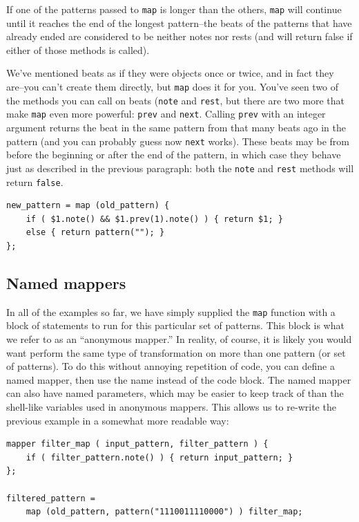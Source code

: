 If one of the patterns passed to {\tt map} is longer than the others, {\tt map} will continue until it reaches the end of the longest pattern--the beats of the patterns that have already ended are considered to be neither notes nor rests (and will return false if either of those methods is called).

We've mentioned beats as if they were objects once or twice, and in fact they are--you can't create them directly, but {\tt map} does it for you.  You've seen two of the methods you can call on beats ({\tt note} and {\tt rest}, but there are two more that make {\tt map} even more powerful:  {\tt prev} and {\tt next}.
Calling {\tt prev} with an integer argument returns the beat in the same pattern from that many beats ago in the pattern (and you can probably guess now {\tt next} works).  These beats may be from before the beginning or after the end of the pattern, in which case they behave just as described in the previous paragraph: both the {\tt note} and {\tt rest} methods will return {\tt false}.

\begin{lstlisting}
new_pattern = map (old_pattern) {
	if ( $1.note() && $1.prev(1).note() ) { return $1; }
	else { return pattern(""); }
};
\end{lstlisting}

\subsection{Named mappers}

In all of the examples so far, we have simply supplied the {\tt map} function with a block of statements to run for this particular set of patterns.  This block is what we refer to as an ``anonymous mapper.''  In reality, of course, it is likely you would want perform the same type of transformation on more than one pattern (or set of patterns).  To do this without annoying repetition of code, you can define a named mapper, then use the name instead of the code block.  The named mapper can also have named parameters, which may be easier to keep track of than the shell-like variables used in anonymous mappers.  This allows us to re-write the previous example in a somewhat more readable way:
\begin{lstlisting}
mapper filter_map ( input_pattern, filter_pattern ) {
	if ( filter_pattern.note() ) { return input_pattern; }
};

filtered_pattern =
	map (old_pattern, pattern("1110011110000") ) filter_map;
\end{lstlisting}



